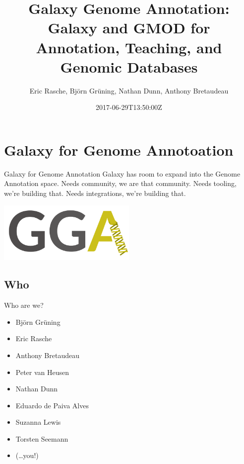 \documentclass[12pt]{phage3slides} %
\title[Galaxy for Genome Annotation, Teaching, Databases]{Galaxy Genome Annotation: Galaxy and GMOD for Annotation, Teaching, and Genomic Databases}
\author[ER, BG, ND, AB]{Eric Rasche, Bj\"orn Gr\"uning, Nathan Dunn, Anthony Bretaudeau}
\date{2017-06-29T13:50:00Z}
\begin{document}
\frame{\titlepage}




\section[GGA]{Galaxy for Genome Annotoation}
\begin{frame}{Galaxy for Genome Annotation}
    Galaxy has room to expand into the Genome Annotation space.
    Needs community, we are that community.
    Needs tooling, we're building that.
    Needs integrations, we're building that.
    \begin{center}
        \includegraphics[width=0.5\textwidth]{gga-clean.png}
    \end{center}
\end{frame}

\subsection{Who}
\begin{frame}{Who are we?}
    \begin{itemize}
        \item Bj\"orn Gr\"uning
        \item Eric Rasche
        \item Anthony Bretaudeau
        \item Peter van Heusen
        \item Nathan Dunn
        \item Eduardo de Paiva Alves
        \item Suzanna Lewis
        \item Torsten Seemann
        \item (\ldots you!)
    \end{itemize}
\end{frame}
\end{document}
